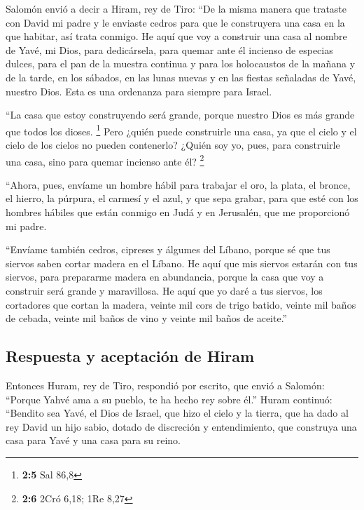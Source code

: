 \begin{paracol}{2}
 Salomón envió a decir a Hiram, rey de Tiro: ``De la misma
manera que trataste con David mi padre y le enviaste cedros para que le
construyera una casa en la que habitar, así trata conmigo.
 He aquí que voy a construir una casa al nombre de Yavé,
mi Dios, para dedicársela, para quemar ante él incienso de especias
dulces, para el pan de la muestra continua y para los holocaustos de la
mañana y de la tarde, en los sábados, en las lunas nuevas y en las
fiestas señaladas de Yavé, nuestro Dios. Esta es una ordenanza para
siempre para Israel.

 ``La casa que estoy construyendo será grande, porque
nuestro Dios es más grande que todos los dioses. \footnote{\textbf{2:5}
  Sal 86,8}  Pero ¿quién puede construirle una casa, ya
que el cielo y el cielo de los cielos no pueden contenerlo? ¿Quién soy
yo, pues, para construirle una casa, sino para quemar incienso ante él?
\footnote{\textbf{2:6} 2Cró 6,18; 1Re 8,27}

 ``Ahora, pues, envíame un hombre hábil para trabajar el
oro, la plata, el bronce, el hierro, la púrpura, el carmesí y el azul, y
que sepa grabar, para que esté con los hombres hábiles que están conmigo
en Judá y en Jerusalén, que me proporcionó mi padre.

 ``Envíame también cedros, cipreses y álgumes del Líbano,
porque sé que tus siervos saben cortar madera en el Líbano. He aquí que
mis siervos estarán con tus siervos,  para prepararme
madera en abundancia, porque la casa que voy a construir será grande y
maravillosa.  He aquí que yo daré a tus siervos, los
cortadores que cortan la madera, veinte mil cors de trigo batido, veinte
mil baños de cebada, veinte mil baños de vino y veinte mil baños de
aceite.''

\hypertarget{respuesta-y-aceptaciuxf3n-de-hiram}{%
\subsection{Respuesta y aceptación de
Hiram}\label{respuesta-y-aceptaciuxf3n-de-hiram}}

 Entonces Huram, rey de Tiro, respondió por escrito, que
envió a Salomón: ``Porque Yahvé ama a su pueblo, te ha hecho rey sobre
él.''  Huram continuó: ``Bendito sea Yavé, el Dios de
Israel, que hizo el cielo y la tierra, que ha dado al rey David un hijo
sabio, dotado de discreción y entendimiento, que construya una casa para
Yavé y una casa para su reino.


\end{paracol}
